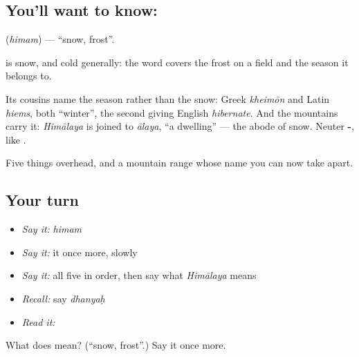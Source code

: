 \subsection*{You'll want to know: }
\textbf{} (\emph{himam}) — \textquotedblleft{}snow, frost\textquotedblright{}.

\textbf{} is snow, and cold generally: the word covers the frost on a field and the season it belongs to.

Its cousins name the season rather than the snow: Greek \emph{kheimōn} and Latin \emph{hiems}, both \textquotedblleft{}winter\textquotedblright{}, the second giving English \emph{hibernate}. And the mountains carry it: \emph{Himālaya} is \textbf{} joined to \emph{ālaya}, \textquotedblleft{}a dwelling\textquotedblright{} — the abode of snow. Neuter \textbf{-}, like \textbf{}.

\begin{grammarlens}[title={What you've built}]
Five things overhead, and a mountain range whose name you can now take apart.
\end{grammarlens}

\subsection*{Your turn}
\begin{itemize}
\raggedright
  \item \emph{Say it:} \emph{himam}
  \item \emph{Say it:} it once more, slowly
  \item \emph{Say it:} all five in order, then say what \emph{Himālaya} means
  \item \emph{Recall:} say \emph{dhanyaḥ}
  \item \emph{Read it:} \textbf{}
\end{itemize}

\begin{tcolorbox}[breakable,colback=teal!4,colframe=teal!35!black,title={Before you move on}]
What does  mean? (\textquotedblleft{}snow, frost\textquotedblright{}.) Say it once more.
\end{tcolorbox}
